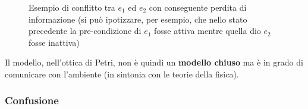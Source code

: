 \begin{definizione}
\begin{figure}[H]
    \caption{Esempio di conflitto tra $e_1$ ed
      $e_2$ con conseguente perdita di informazione (si può ipotizzare, per
      esempio, che nello stato precedente la pre-condizione di $e_1$ fosse attiva
      mentre quella dio $e_2$ fosse inattiva)} 
  \end{figure}
  Il modello, nell'ottica di Petri, non è quindi un \textbf{modello chiuso} ma è
  in grado di comunicare con l'ambiente (in sintonia con le teorie della
  fisica). 
\end{definizione} \vspace{5mm} %
\subsubsection{Confusione}
